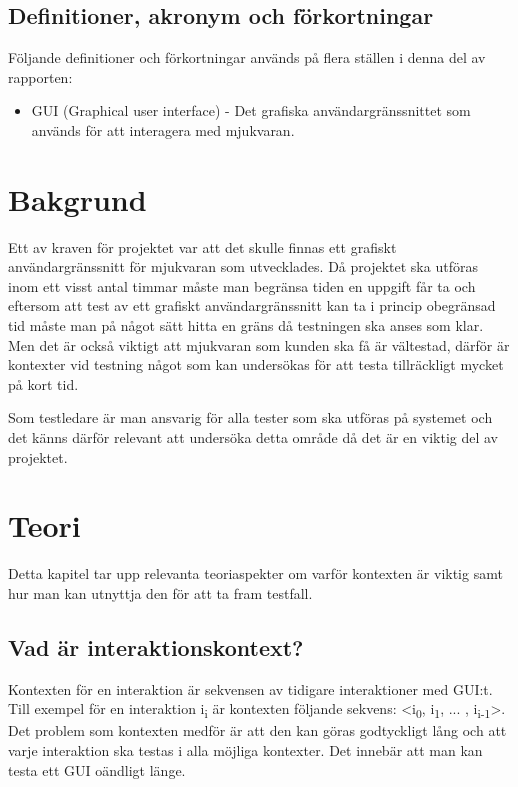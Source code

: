 \subsection{Definitioner, akronym och förkortningar}
Följande definitioner och förkortningar används på flera ställen i denna del av rapporten:
\begin{itemize}
	\item GUI (Graphical user interface) - Det grafiska användargränssnittet som används för att interagera med mjukvaran.
\end{itemize}

\section{Bakgrund}
\label{sec:background-holmberg}

Ett av kraven för projektet var att det skulle finnas ett grafiskt användargränssnitt för mjukvaran som utvecklades. Då projektet ska utföras inom ett visst antal timmar måste man begränsa tiden en uppgift får ta och eftersom att test av ett grafiskt användargränssnitt kan ta i princip obegränsad tid måste man på något sätt hitta en gräns då testningen ska anses som klar. Men det är också viktigt att mjukvaran som kunden ska få är vältestad, därför är kontexter vid testning något som kan undersökas för att testa tillräckligt mycket på kort tid.

Som testledare är man ansvarig för alla tester som ska utföras på systemet och det känns därför relevant att undersöka detta område då det är en viktig del av projektet.

\section{Teori}
\label{sec:theory-holmberg}

Detta kapitel tar upp relevanta teoriaspekter om varför kontexten är viktig samt hur man kan utnyttja den för att ta fram testfall.

\subsection{Vad är interaktionskontext?}

Kontexten för en interaktion är sekvensen av tidigare interaktioner med GUI:t. Till exempel för en interaktion i\textsubscript{i} är kontexten följande sekvens: <i\textsubscript{0}, i\textsubscript{1},  ... , i\textsubscript{i-1}>. Det problem som kontexten medför är att den kan göras godtyckligt lång och att varje interaktion ska testas i alla möjliga kontexter. Det innebär att man kan testa ett GUI oändligt länge. \cite{yuan2011gui}

